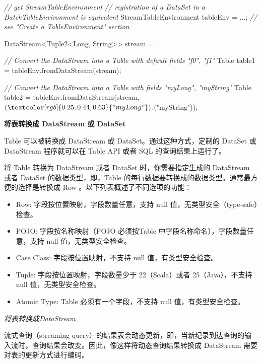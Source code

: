 \documentclass[cn,11pt,chinese]{elegantbook}
\newenvironment{Shaded}{}{}
\newcommand{\BuiltInTok}[1]{#1}
\newcommand{\CommentTok}[1]{\textcolor[rgb]{0.38,0.63,0.69}{\textit{#1}}}
\newcommand{\FunctionTok}[1]{\textcolor[rgb]{0.02,0.16,0.49}{#1}}
\newcommand{\NormalTok}[1]{#1}
\newcommand{\StringTok}[1]{\textcolor[rgb]{0.25,0.44,0.63}{#1}}
\providecommand{\tightlist}{%
  \setlength{\itemsep}{0pt}\setlength{\parskip}{0pt}}
\begin{document}
\begin{Shaded}
\begin{Highlighting}[]
\CommentTok{// get StreamTableEnvironment}
\CommentTok{// registration of a DataSet in a BatchTableEnvironment is equivalent}
\NormalTok{StreamTableEnvironment tableEnv = ...; }\CommentTok{// see "Create a TableEnvironment" section}

\NormalTok{DataStream\textless{}Tuple2\textless{}}\BuiltInTok{Long}\NormalTok{, }\BuiltInTok{String}\NormalTok{\textgreater{}\textgreater{} stream = ...}

\CommentTok{// Convert the DataStream into a Table with default fields "f0", "f1"}
\NormalTok{Table table1 = tableEnv.}\FunctionTok{fromDataStream}\NormalTok{(stream);}

\CommentTok{// Convert the DataStream into a Table with fields "myLong", "myString"}
\NormalTok{Table table2 = tableEnv.}\FunctionTok{fromDataStream}\NormalTok{(stream, $(}\StringTok{"myLong"}\NormalTok{), $(}\StringTok{"myString"}\NormalTok{));}
\end{Highlighting}
\end{Shaded}

\textbf{将表转换成 DataStream 或 DataSet}

Table 可以被转换成 DataStream 或 DataSet。通过这种方式，定制的 DataSet
或 DataStream 程序就可以在 Table API 或者 SQL 的查询结果上运行了。

将 Table 转换为 DataStream 或者 DataSet 时，你需要指定生成的 DataStream
或者 DataSet 的数据类型，即，Table
的每行数据要转换成的数据类型。通常最方便的选择是转换成 Row
。以下列表概述了不同选项的功能：

\begin{itemize}
\tightlist
\item
  Row: 字段按位置映射，字段数量任意，支持 null
  值，无类型安全（type-safe）检查。
\item
  POJO: 字段按名称映射（POJO 必须按Table
  中字段名称命名），字段数量任意，支持 null 值，无类型安全检查。
\item
  Case Class: 字段按位置映射，不支持 null 值，有类型安全检查。
\item
  Tuple: 字段按位置映射，字段数量少于 22（Scala）或者 25（Java），不支持
  null 值，无类型安全检查。
\item
  Atomic Type: Table 必须有一个字段，不支持 null 值，有类型安全检查。
\end{itemize}

\emph{将表转换成DataStream}

流式查询（streaming
query）的结果表会动态更新，即，当新纪录到达查询的输入流时，查询结果会改变。因此，像这样将动态查询结果转换成
DataStream 需要对表的更新方式进行编码。
\end{document}
